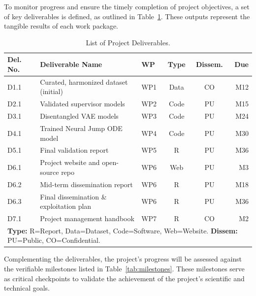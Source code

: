 \documentclass[11pt, a4paper]{article}
\begin{document}
To monitor progress and ensure the timely completion of project objectives, a set of key deliverables is defined, as outlined in Table~\ref{tab:deliverables}. These outputs represent the tangible results of each work package.

\begin{table}[H]
    \centering
    \caption{List of Project Deliverables.}
    \label{tab:deliverables}
    \small
    \begin{tabular}{lp{5.5cm}lccr}
        \toprule
        \textbf{Del. No.} & \textbf{Deliverable Name} & \textbf{WP} & \textbf{Type} & \textbf{Dissem.} & \textbf{Due} \\
        \midrule
        D1.1 & Curated, harmonized dataset (initial) & WP1 & Data & CO & M12 \\
        D2.1 & Validated supervisor models & WP2 & Code & PU & M15 \\
        D3.1 & Disentangled VAE models & WP3 & Code & PU & M24 \\
        D4.1 & Trained Neural Jump ODE model & WP4 & Code & PU & M30 \\
        D5.1 & Final validation report & WP5 & R & PU & M36 \\
        D6.1 & Project website and open-source repo & WP6 & Web & PU & M3 \\
        D6.2 & Mid-term dissemination report & WP6 & R & PU & M18 \\
        D6.3 & Final dissemination \& exploitation plan & WP6 & R & PU & M36 \\
        D7.1 & Project management handbook & WP7 & R & CO & M2 \\
        \bottomrule
        \multicolumn{6}{p{13cm}}{\footnotesize \textbf{Type:} R=Report, Data=Dataset, Code=Software, Web=Website. \textbf{Dissem:} PU=Public, CO=Confidential.}
    \end{tabular}
\end{table}

Complementing the deliverables, the project's progress will be assessed against the verifiable milestones listed in Table~\ref{tab:milestones}. These milestones serve as critical checkpoints to validate the achievement of the project's scientific and technical goals.
\end{document}
